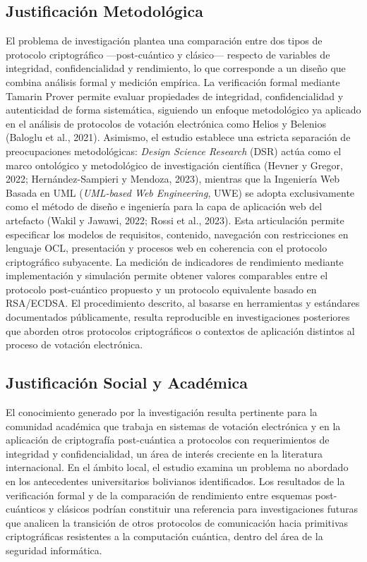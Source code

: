 \subsection{Justificación Metodológica}
El problema de investigación plantea una comparación entre dos tipos de protocolo criptográfico —post-cuántico y clásico— respecto de variables de integridad, confidencialidad y rendimiento, lo que corresponde a un diseño que combina análisis formal y medición empírica. La verificación formal mediante Tamarin Prover permite evaluar propiedades de integridad, confidencialidad y autenticidad de forma sistemática, siguiendo un enfoque metodológico ya aplicado en el análisis de protocolos de votación electrónica como Helios y Belenios (Baloglu et al., 2021). Asimismo, el estudio establece una estricta separación de preocupaciones metodológicas: \textit{Design Science Research} (DSR) actúa como el marco ontológico y metodológico de investigación científica (Hevner y Gregor, 2022; Hernández-Sampieri y Mendoza, 2023), mientras que la Ingeniería Web Basada en UML (\textit{UML-based Web Engineering}, UWE) se adopta exclusivamente como el método de diseño e ingeniería para la capa de aplicación web del artefacto (Wakil y Jawawi, 2022; Rossi et al., 2023). Esta articulación permite especificar los modelos de requisitos, contenido, navegación con restricciones en lenguaje OCL, presentación y procesos web en coherencia con el protocolo criptográfico subyacente. La medición de indicadores de rendimiento mediante implementación y simulación permite obtener valores comparables entre el protocolo post-cuántico propuesto y un protocolo equivalente basado en RSA/ECDSA. El procedimiento descrito, al basarse en herramientas y estándares documentados públicamente, resulta reproducible en investigaciones posteriores que aborden otros protocolos criptográficos o contextos de aplicación distintos al proceso de votación electrónica.

\subsection{Justificación Social y Académica}
El conocimiento generado por la investigación resulta pertinente para la comunidad académica que trabaja en sistemas de votación electrónica y en la aplicación de criptografía post-cuántica a protocolos con requerimientos de integridad y confidencialidad, un área de interés creciente en la literatura internacional. En el ámbito local, el estudio examina un problema no abordado en los antecedentes universitarios bolivianos identificados. Los resultados de la verificación formal y de la comparación de rendimiento entre esquemas post-cuánticos y clásicos podrían constituir una referencia para investigaciones futuras que analicen la transición de otros protocolos de comunicación hacia primitivas criptográficas resistentes a la computación cuántica, dentro del área de la seguridad informática.

